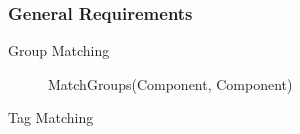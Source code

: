\subsubsection{General Requirements}

\begin{description}
\item[Group Matching]

MatchGroups(Component, Component)

\item[Tag Matching]


\end{description}
